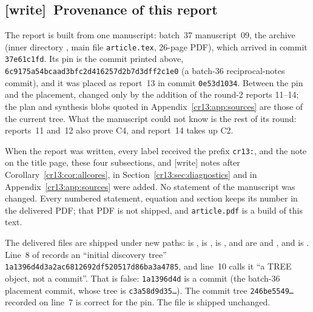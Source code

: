 \documentclass[11pt,letterpaper]{article}
\theoremstyle{definition}
\theoremstyle{remark}\newtheorem{remark}[theorem]{Remark}
\numberwithin{equation}{section}
\newcommand{\wtag}{\textup{[write]}}
\begin{document}
\subsection{\wtag\ Provenance of this report}
\label{cr13:sec:wprov}
The report is built from one manuscript: batch~37 manuscript~09, the archive  (inner directory , main file \texttt{article.tex}, 26-page PDF), which arrived in commit \texttt{37e61c1fd}. Its pin is the commit printed above, \texttt{6c9175a54bcaad3bfc2d416257d2b7d3dff2c1e0} (a batch-36 reciprocal-notes commit), and it was placed as report~13 in commit \texttt{0e53d1034}. Between the pin and the placement,  changed only by the addition of the round-2 reports 11--14; the plan and synthesis blobs quoted in Appendix~\ref{cr13:app:sources} are those of the current tree. What the manuscript could not know is the rest of its round: reports~11 and~12 also prove C4, and report~14 takes up C2.

When the report was written, every label received the prefix \texttt{cr13:}, and the note on the title page, these four subsections, and \wtag{} notes after Corollary~\ref{cr13:cor:allcores}, in Section~\ref{cr13:sec:diagnostics} and in Appendix~\ref{cr13:app:sources} were added. No statement of the manuscript was changed. Every numbered statement, equation and section keeps its number in the delivered PDF; that PDF is not shipped, and \texttt{article.pdf} is a build of this text.

The delivered files are shipped under new paths:  is ,  is ,  is ,  and  are  and , and  is . Line~8 of  records an ``initial discovery tree'' \texttt{1a1396d4d3a2ac6812692df520517d86ba3a4785}, and line~10 calls it ``a TREE object, not a commit''. That is false: \texttt{1a1396d4d} is a commit (the batch-36 placement commit, whose tree is \texttt{c3a58d9d35\dots}). The commit tree \texttt{246be5549\dots} recorded on line~7 is correct for the pin. The file is shipped unchanged.
\end{document}
